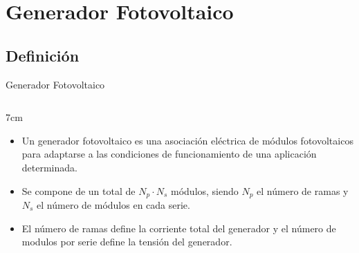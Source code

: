 \documentclass[xcolor={usenames,svgnames,dvipsnames}]{beamer}
\begin{document}
\section{Generador Fotovoltaico}
\label{sec-2}

\subsection{Definición}
\label{sec-2-1}

\begin{frame}[label=sec-2-1-1]{Generador Fotovoltaico}
\begin{columns}
\begin{column}{7cm\textwidth}

\begin{itemize}
\item Un generador fotovoltaico es una asociación eléctrica de módulos fotovoltaicos para adaptarse a las condiciones de funcionamiento de una aplicación determinada.

\item Se compone de un total de $N_{p}\cdot N_{s}$ módulos, siendo $N_{p}$ el número de ramas y $N_{s}$ el número de módulos en cada serie.

\item El número de ramas define la corriente total del generador y el número de modulos por serie define la tensión del generador.
\end{itemize}
\end{column}



\end{columns}
\end{frame}
\end{document}
